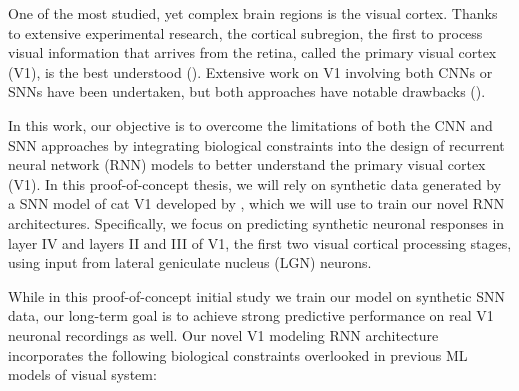 One of the most studied, yet complex brain regions is the visual cortex.
Thanks to extensive experimental research, the cortical subregion, the first to process visual information that arrives from the retina, called the primary visual
cortex (V1), is the best understood (\citet{miikkulainen2006computational}). 
Extensive work on V1 involving both CNNs or SNNs have been undertaken, but both approaches have notable drawbacks (\citet{niell2021cortical}).

In this work, our objective is to overcome the limitations of both the CNN and SNN
approaches by integrating biological constraints into the design of recurrent neural network (RNN) models to better understand the primary visual cortex (V1). In this proof-of-concept thesis, we will rely on synthetic data generated by a SNN model of cat V1 developed by \citet{antolik2024comprehensive}, which we will use to train our novel RNN architectures. Specifically, we focus on predicting synthetic neuronal responses in layer IV and layers II and III of V1, the first two visual cortical processing stages, using input from lateral geniculate nucleus (LGN) neurons. 

While in this proof-of-concept initial study we train our model on synthetic SNN data, our long-term goal is to achieve strong predictive performance on real V1
neuronal recordings as well. Our novel V1 modeling RNN architecture incorporates the following biological constraints overlooked in previous ML models of visual system:

